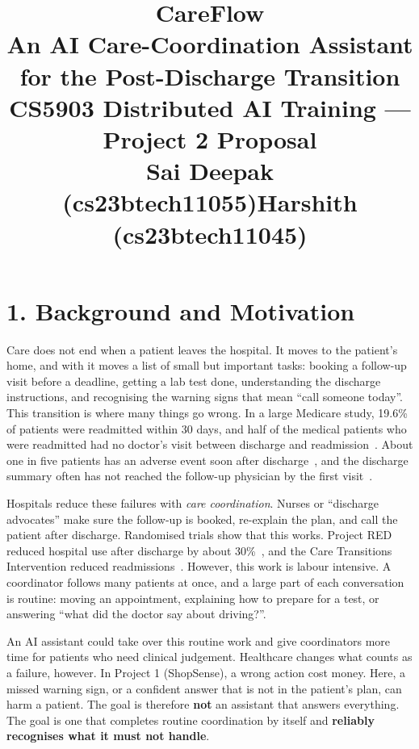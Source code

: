 \documentclass[11pt,a4paper]{article}
\title{\vspace{-2.4cm}\textbf{CareFlow}\\[6pt]
       \large An AI Care-Coordination Assistant for the Post-Discharge Transition\\[4pt]
       \normalsize CS5903 Distributed AI Training --- Project 2 Proposal\\[9pt]
       \normalsize Sai Deepak (cs23btech11055)\quad Harshith (cs23btech11045)}
\author{}
\date{}
\begin{document}
\maketitle
\vspace{-1.1cm}

\section*{1. Background and Motivation}

Care does not end when a patient leaves the hospital. It moves to the patient's home, and with it moves a list of small but important tasks: booking a follow-up visit before a deadline, getting a lab test done, understanding the discharge instructions, and recognising the warning signs that mean ``call someone today''. This transition is where many things go wrong. In a large Medicare study, 19.6\% of patients were readmitted within 30 days, and half of the medical patients who were readmitted had no doctor's visit between discharge and readmission~\cite{jencks}. About one in five patients has an adverse event soon after discharge~\cite{forster}, and the discharge summary often has not reached the follow-up physician by the first visit~\cite{kripalani}.

Hospitals reduce these failures with \emph{care coordination}. Nurses or ``discharge advocates'' make sure the follow-up is booked, re-explain the plan, and call the patient after discharge. Randomised trials show that this works. Project RED reduced hospital use after discharge by about 30\%~\cite{red}, and the Care Transitions Intervention reduced readmissions~\cite{coleman}. However, this work is labour intensive. A coordinator follows many patients at once, and a large part of each conversation is routine: moving an appointment, explaining how to prepare for a test, or answering ``what did the doctor say about driving?''.

An AI assistant could take over this routine work and give coordinators more time for patients who need clinical judgement. Healthcare changes what counts as a failure, however. In Project 1 (ShopSense), a wrong action cost money. Here, a missed warning sign, or a confident answer that is not in the patient's plan, can harm a patient. The goal is therefore \textbf{not} an assistant that answers everything. The goal is one that completes routine coordination by itself and \textbf{reliably recognises what it must not handle}.
\end{document}
